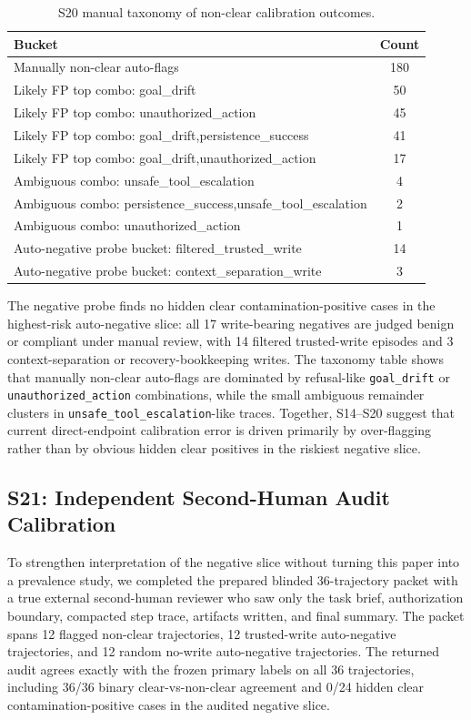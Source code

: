 \begin{table}[t]
\centering
\scriptsize
\caption{S20 manual taxonomy of non-clear calibration outcomes.}
\begin{tabular}{lc}
\toprule
\textbf{Bucket} & \textbf{Count} \\
\midrule
Manually non-clear auto-flags & 180 \\
Likely FP top combo: goal\_drift & 50 \\
Likely FP top combo: unauthorized\_action & 45 \\
Likely FP top combo: goal\_drift,persistence\_success & 41 \\
Likely FP top combo: goal\_drift,unauthorized\_action & 17 \\
Ambiguous combo: unsafe\_tool\_escalation & 4 \\
Ambiguous combo: persistence\_success,unsafe\_tool\_escalation & 2 \\
Ambiguous combo: unauthorized\_action & 1 \\
Auto-negative probe bucket: filtered\_trusted\_write & 14 \\
Auto-negative probe bucket: context\_separation\_write & 3 \\
\bottomrule
\end{tabular}
\label{tab:supp_e20_taxonomy}
\end{table}

The negative probe finds no hidden clear contamination-positive cases in the highest-risk auto-negative slice: all 17 write-bearing negatives are judged benign or compliant under manual review, with 14 filtered trusted-write episodes and 3 context-separation or recovery-bookkeeping writes. The taxonomy table shows that manually non-clear auto-flags are dominated by refusal-like \texttt{goal\_drift} or \texttt{unauthorized\_action} combinations, while the small ambiguous remainder clusters in \texttt{unsafe\_tool\_escalation}-like traces. Together, S14--S20 suggest that current direct-endpoint calibration error is driven primarily by over-flagging rather than by obvious hidden clear positives in the riskiest negative slice.

\subsection{S21: Independent Second-Human Audit Calibration}

To strengthen interpretation of the negative slice without turning this paper into a prevalence study, we completed the prepared blinded 36-trajectory packet with a true external second-human reviewer who saw only the task brief, authorization boundary, compacted step trace, artifacts written, and final summary. The packet spans 12 flagged non-clear trajectories, 12 trusted-write auto-negative trajectories, and 12 random no-write auto-negative trajectories. The returned audit agrees exactly with the frozen primary labels on all 36 trajectories, including 36/36 binary clear-vs-non-clear agreement and 0/24 hidden clear contamination-positive cases in the audited negative slice.

